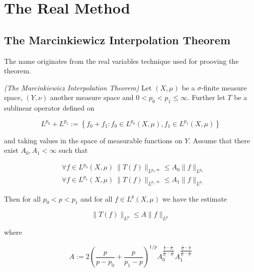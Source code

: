 \section{The Real Method}
\subsection{The Marcinkiewicz Interpolation Theorem}
The name originates from the real variables technique used for prooving the theorem.
\vspace{2mm}
\begin{mdframed}
	\begin{theorem}\emph{(The Marcinkiewicz Interpolation Theorem)}
		Let $(X,\mu)$ be a $\sigma$-finite measure space, $(Y,\nu)$ another measure space and $0 < p_0 < p_1 \leqslant \infty$. Further let $T$ be a sublinear operator defined on
		
		\begin{equation*}
			L^{p_0} + L^{p_1} := \left\{ f_0 + f_1 : f_0 \in L^{p_0}(X,\mu), f_1 \in L^{p_1}(X,\mu) \right\}
		\end{equation*}
		
		and taking values in the space of measurable functions on $Y$. Assume that there exist $A_0,A_1 < \infty$ such that

		\begin{align}
			&\forall f \in L^{p_0}(X,\mu)~\|T(f)\|_{L^{p_0,\infty}} \leqslant A_0 \|f\|_{L^{p_0}}\label{hyp:fp_0}\\
			&\forall f \in L^{p_1}(X,\mu)~\|T(f)\|_{L^{p_1,\infty}} \leqslant A_1 \|f\|_{L^{p_1}}\label{hyp:fp_1}
		\end{align}

		Then for all $p_0 < p < p_1$ and for all $f \in L^p(X,\mu)$ we have the estimate

		\begin{equation}
			\|T(f)\|_{L^p} \leqslant A \|f\|_{L^p}
		\end{equation}

		where

		\begin{equation}
			A := 2\left( \frac{p}{p - p_0} + \frac{p}{p_1 - p} \right)^{1/p}A_0^{\frac{\frac{1}{p} - \frac{1}{p_1}}{\frac{1}{p_0}-\frac{1}{p_1}}}A_1^{\frac{\frac{1}{p_0}-\frac{1}{p}}{\frac{1}{p_0}-\frac{1}{p_1}}}
			\label{eq:constant}
		\end{equation}
	\end{theorem}
\end{mdframed}

